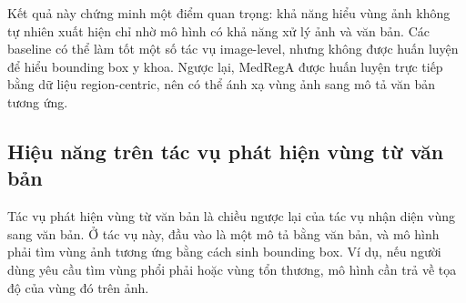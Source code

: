 \documentclass[12pt,a4paper,oneside]{extarticle}
\begin{document}
\begin{table}[htbp]
\centering
\caption{Kết quả trên tác vụ nhận diện vùng sang văn bản}
\label{tab:region_to_text}
\end{table}

Kết quả này chứng minh một điểm quan trọng: khả năng hiểu vùng ảnh không tự nhiên xuất hiện chỉ nhờ mô hình có khả năng xử lý ảnh và văn bản. Các baseline có thể làm tốt một số tác vụ image-level, nhưng không được huấn luyện để hiểu bounding box y khoa. Ngược lại, MedRegA được huấn luyện trực tiếp bằng dữ liệu region-centric, nên có thể ánh xạ vùng ảnh sang mô tả văn bản tương ứng.

\subsection{Hiệu năng trên tác vụ phát hiện vùng từ văn bản}

Tác vụ phát hiện vùng từ văn bản là chiều ngược lại của tác vụ nhận diện vùng sang văn bản. Ở tác vụ này, đầu vào là một mô tả bằng văn bản, và mô hình phải tìm vùng ảnh tương ứng bằng cách sinh bounding box. Ví dụ, nếu người dùng yêu cầu tìm vùng phổi phải hoặc vùng tổn thương, mô hình cần trả về tọa độ của vùng đó trên ảnh.
\end{document}
